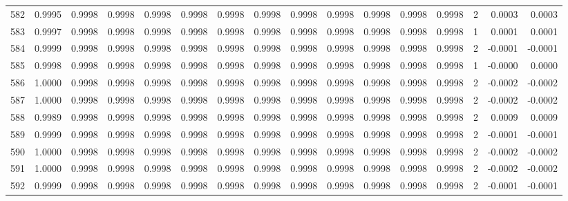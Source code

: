 \begin{tabular}{lrrrrrrrrrrrrrrr}
582 &      0.9995 &  0.9998 &  0.9998 &  0.9998 &  0.9998 &  0.9998 &  0.9998 &  0.9998 &  0.9998 &  0.9998 &   0.9998 &     0.9998 &      2 &                    0.0003 &                     0.0003 \\
583 &      0.9997 &  0.9998 &  0.9998 &  0.9998 &  0.9998 &  0.9998 &  0.9998 &  0.9998 &  0.9998 &  0.9998 &   0.9998 &     0.9998 &      1 &                    0.0001 &                     0.0001 \\
584 &      0.9999 &  0.9998 &  0.9998 &  0.9998 &  0.9998 &  0.9998 &  0.9998 &  0.9998 &  0.9998 &  0.9998 &   0.9998 &     0.9998 &      2 &                   -0.0001 &                    -0.0001 \\
585 &      0.9998 &  0.9998 &  0.9998 &  0.9998 &  0.9998 &  0.9998 &  0.9998 &  0.9998 &  0.9998 &  0.9998 &   0.9998 &     0.9998 &      1 &                   -0.0000 &                     0.0000 \\
586 &      1.0000 &  0.9998 &  0.9998 &  0.9998 &  0.9998 &  0.9998 &  0.9998 &  0.9998 &  0.9998 &  0.9998 &   0.9998 &     0.9998 &      2 &                   -0.0002 &                    -0.0002 \\
587 &      1.0000 &  0.9998 &  0.9998 &  0.9998 &  0.9998 &  0.9998 &  0.9998 &  0.9998 &  0.9998 &  0.9998 &   0.9998 &     0.9998 &      2 &                   -0.0002 &                    -0.0002 \\
588 &      0.9989 &  0.9998 &  0.9998 &  0.9998 &  0.9998 &  0.9998 &  0.9998 &  0.9998 &  0.9998 &  0.9998 &   0.9998 &     0.9998 &      2 &                    0.0009 &                     0.0009 \\
589 &      0.9999 &  0.9998 &  0.9998 &  0.9998 &  0.9998 &  0.9998 &  0.9998 &  0.9998 &  0.9998 &  0.9998 &   0.9998 &     0.9998 &      2 &                   -0.0001 &                    -0.0001 \\
590 &      1.0000 &  0.9998 &  0.9998 &  0.9998 &  0.9998 &  0.9998 &  0.9998 &  0.9998 &  0.9998 &  0.9998 &   0.9998 &     0.9998 &      2 &                   -0.0002 &                    -0.0002 \\
591 &      1.0000 &  0.9998 &  0.9998 &  0.9998 &  0.9998 &  0.9998 &  0.9998 &  0.9998 &  0.9998 &  0.9998 &   0.9998 &     0.9998 &      2 &                   -0.0002 &                    -0.0002 \\
592 &      0.9999 &  0.9998 &  0.9998 &  0.9998 &  0.9998 &  0.9998 &  0.9998 &  0.9998 &  0.9998 &  0.9998 &   0.9998 &     0.9998 &      2 &                   -0.0001 &                    -0.0001 \\

\end{tabular}
